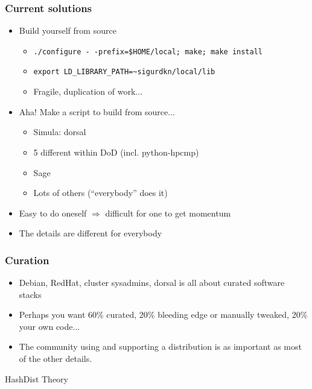 \documentclass[sans,mathserif]{beamer}
\begin{document}
\begin{frame}
  \frametitle{Current solutions}
  \begin{itemize}
  \item<+-> Build yourself from source
    \begin{itemize}
    \item<+-> {\tt ./configure -\,{}-prefix=\$HOME/local; make; make install}
    \item<+-> {\tt export LD\_LIBRARY\_PATH=\textasciitilde{}sigurdkn/local/lib}
    \item<+-> Fragile, duplication of work...
    \end{itemize}
  \item<+-> Aha! Make a script to build from source...
    \begin{itemize}
    \item Simula: dorsal
    \item 5 different within DoD (incl. python-hpcmp)
    \item Sage
    \item Lots of others (``everybody'' does it)
    \end{itemize}
  \item<+-> Easy to do oneself $\Rightarrow$ difficult for one to get
    momentum
  \item<+-> The details are different for everybody
  \end{itemize}

\end{frame}


\begin{frame}
  \frametitle{Curation}
  
  \begin{itemize}
  \item<+-> Debian, RedHat, cluster sysadmins, dorsal is all about curated software stacks
  \item<+-> Perhaps you want 60\% curated, 20\% bleeding edge or manually tweaked, 20\% your own code...
  \item<+-> The community using and supporting a distribution is as  important as  most of the other details. 
  \end{itemize}
\end{frame}

\begin{frame}
  \begin{center}
    {\Large HashDist Theory}
  \end{center}
\end{frame}
\end{document}
